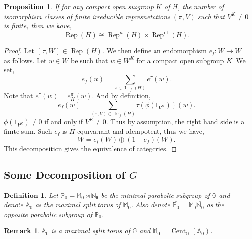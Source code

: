\documentclass[8pt]{article}
\newtheorem{proposition}{Proposition}[section]
\newtheorem{definition}{Definition}[section]
\newtheorem{remark}{Remark}[section]
\DeclareMathOperator{\Rep}{Rep}
\DeclareMathOperator{\Cent}{Cent}
\DeclareMathOperator{\Irr}{Irr}
\DeclareMathOperator{\nf}{nf}
\newcommand{\N}[0]{\mathbb{N}}
\newcommand{\A}[0]{\mathbb{A}}
\newcommand{\G}[0]{\mathbb{G}}
\newcommand{\Para}[0]{\mathbb{P}}
\newcommand{\M}[0]{\mathbb{M}}
\begin{document}
\begin{proposition}
  \label{proposition_33}
  If for any compact open subgroup $K$ of $H$, the number of isomorphism classes of finite irreducible represnetations $(\pi,V)$ such that $V^K\not=0$ is finite, then we have,
  \begin{equation*}
    \Rep(H)\cong \Rep^n(H)\times\Rep^{\nf}(H).
  \end{equation*}
\end{proposition}

\begin{proof}
  Let $(\tau,W)\in\Rep(H)$. We then define an endomorphism $e_f:W\to W$ as follows. Let $w\in W$ be such that $w\in W^K$ for a compact open subgroup $K$. We set,
  \begin{equation*}
    e_f(w) = \sum_{\pi\in\Irr_{f}(H)}e^\pi(w).
  \end{equation*}
  Note that $e^\pi(w) = e^\pi_K(w)$. And by definition,
  \begin{equation*}
    e_f(w) = \sum_{(\pi,V)\in\Irr_{f}(H)}\tau(\phi(1_{V^K}))(w).
  \end{equation*}
  $\phi(1_{V^K})\not=0$ if and only if $V^K\not=0$. Thus by assumption, the right hand side is a finite sum. Such $e_f$ is $H$-equivariant and idempotent, thus we have,
  \begin{equation*}
    W = e_f(W)\oplus (1-e_f)(W).
  \end{equation*}
  This decomposition gives the equivalence of categories.
\end{proof}

\subsection{Some Decomposition of $G$}

\begin{definition}
  Let $\Para_0=\M_0\rtimes \N_0$ be the minimal parabolic subgroup of $\G$ and denote $\A_0$ as 
  the maximal split torus of $\M_0$. Also denote $\overline{\Para_0} = \M_0\overline{\N_0}$ as the opposite parabolic subgroup of $\Para_0$.
\end{definition}

\begin{remark}
  $\A_0$ is a maximal split torus of $\G$ and $\M_0 = \Cent_\G(\A_0)$.
\end{remark}
\end{document}
